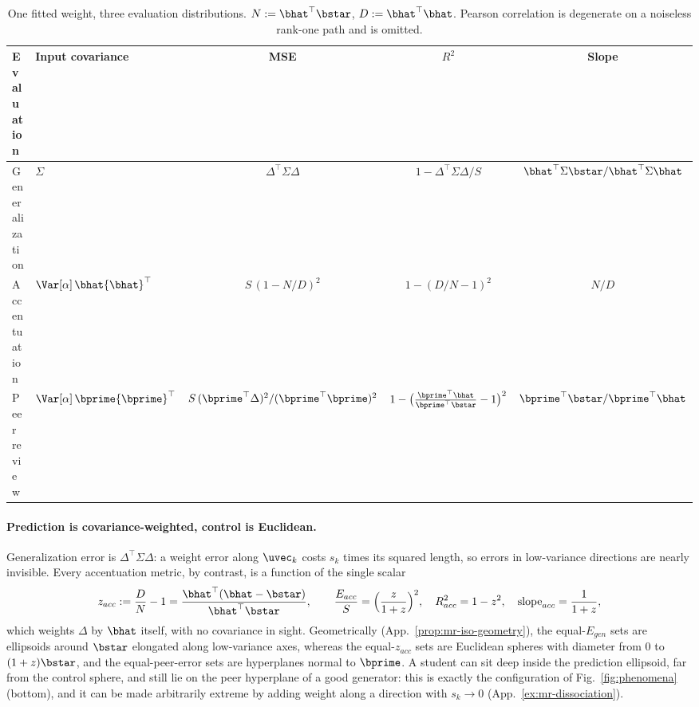 \begin{table}[t]
\centering\small
\begin{tabular}{@{}llccc@{}}
\toprule
Evaluation & Input covariance & MSE & $R^2$ & Slope \\
\midrule
Generalization & $\Sigma$ & $\Delta^\top\Sigma\Delta$ & $1-\Delta^\top\Sigma\Delta/S$ & ${\bhat}^\top\Sigma\bstar/{\bhat}^\top\Sigma\bhat$ \\
Accentuation & $\Var[\alpha]\,\bhat{\bhat}^\top$ & $S\,(1-N/D)^2$ & $1-(D/N-1)^2$ & $N/D$ \\
Peer review & $\Var[\alpha]\,\bprime{\bprime}^\top$ & $S\,({\bprime}^\top\Delta)^2/({\bprime}^\top\bprime)^2$ & $1-\big(\frac{{\bprime}^\top\bhat}{{\bprime}^\top\bstar}-1\big)^2$ & ${\bprime}^\top\bstar/{\bprime}^\top\bhat$ \\
\bottomrule
\end{tabular}
\caption{One fitted weight, three evaluation distributions. $N:={\bhat}^\top\bstar$, $D:={\bhat}^\top\bhat$. Pearson correlation is degenerate on a noiseless rank-one path and is omitted.}
\label{tab:evaluation-metrics}
\end{table}

\paragraph{Prediction is covariance-weighted, control is Euclidean.}
Generalization error is $\Delta^\top\Sigma\Delta$: a weight error along $\uvec_k$ costs $s_k$ times its squared length, so errors in low-variance directions are nearly invisible. Every accentuation metric, by contrast, is a function of the single scalar
\begin{equation}
z_{acc}:=\frac DN-1=\frac{{\bhat}^\top(\bhat-\bstar)}{{\bhat}^\top\bstar},
\qquad
\frac{E_{acc}}{S}=\Big(\frac{z}{1+z}\Big)^2,\quad R^2_{acc}=1-z^2,\quad \mathrm{slope}_{acc}=\frac{1}{1+z},
\label{eq:acc_metric_ND_depen}
\end{equation}
which weights $\Delta$ by $\bhat$ itself, with no covariance in sight. Geometrically (App.~\ref{prop:mr-iso-geometry}), the equal-$E_{gen}$ sets are ellipsoids around $\bstar$ elongated along low-variance axes, whereas the equal-$z_{acc}$ sets are Euclidean spheres with diameter from $0$ to $(1+z)\bstar$, and the equal-peer-error sets are hyperplanes normal to $\bprime$. A student can sit deep inside the prediction ellipsoid, far from the control sphere, and still lie on the peer hyperplane of a good generator: this is exactly the configuration of Fig.~\ref{fig:phenomena} (bottom), and it can be made arbitrarily extreme by adding weight along a direction with $s_k\to0$ (App.~\ref{ex:mr-dissociation}).


